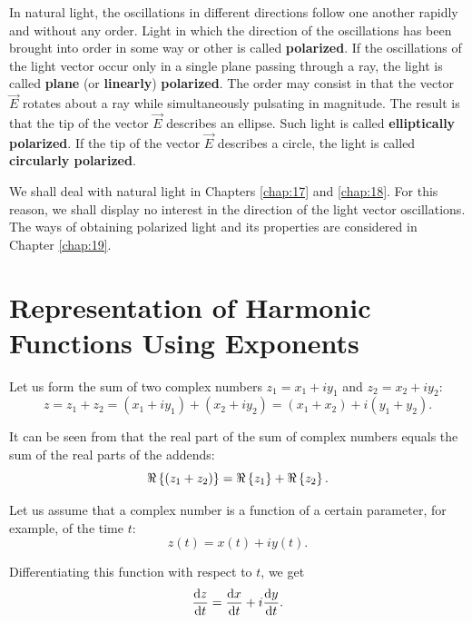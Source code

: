In natural light, the oscillations in different directions follow one another rapidly and without any order.
Light in which the direction of the oscillations has been brought into order in some way or other is called \textbf{polarized}.
If the oscillations of the light vector occur only in a single plane passing through a ray, the light is called \textbf{plane} (or \textbf{linearly}) \textbf{polarized}.
The order may consist in that the vector $\vec{E}$ rotates about a ray while simultaneously pulsating in magnitude.
The result is that the tip of the vector $\vec{E}$ describes an ellipse.
Such light is called \textbf{elliptically polarized}.
If the tip of the vector $\vec{E}$ describes a circle, the light is called \textbf{circularly polarized}.

We shall deal with natural light in Chapters \ref{chap:17} and \ref{chap:18}.
For this reason, we shall display no interest in the direction of the light vector oscillations.
The ways of obtaining polarized light and its properties are considered in Chapter \ref{chap:19}.

\section{Representation of Harmonic Functions Using Exponents}\label{sec:16_2}

Let us form the sum of two complex numbers $z_1 = x_1 + i y_1$ and $z_2 = x_2 + i y_2$:
\begin{equation}\label{eq:16_11}
    z = z_1 + z_2 = (x_1 + i y_1) + (x_2 + i y_2) = (x_1 + x_2) + i (y_1 + y_2).
\end{equation}

\noindent
It can be seen from  that the real part of the sum of complex numbers equals the sum of the real parts of the addends:
\begin{equation}\label{eq:16_12}
    \Re\left\{(z_1 + z_2)\right\} = \Re\left\{z_1\right\} + \Re\left\{z_2\right\}.
\end{equation}

Let us assume that a complex number is a function of a certain parameter, for example, of the time $t$:
\begin{equation*}
    z(t) = x(t) + i y(t).
\end{equation*}

\noindent
Differentiating this function with respect to $t$, we get
\begin{equation*}
    \dfrac{\mathrm{d} z}{\mathrm{d} t} = \dfrac{\mathrm{d} x}{\mathrm{d} t} + i \dfrac{\mathrm{d} y}{\mathrm{d} t}.
\end{equation*}

